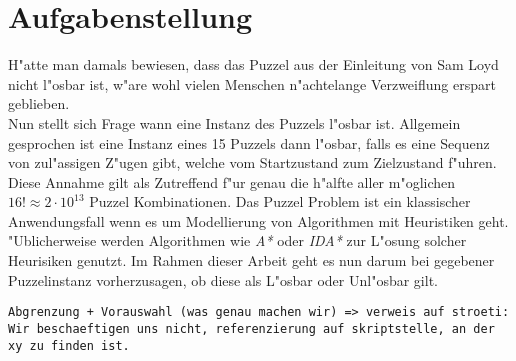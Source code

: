 \section{Aufgabenstellung} %
\label{cha:Aufgabenstellung}
H"atte man damals bewiesen, dass das Puzzel aus der Einleitung von Sam Loyd nicht l"osbar ist, w"are wohl vielen Menschen n"achtelange Verzweiflung erspart geblieben.\\
Nun stellt sich Frage wann eine Instanz des Puzzels l"osbar ist. Allgemein gesprochen ist eine Instanz eines 15 Puzzels dann l"osbar, falls es eine Sequenz von zul"assigen Z"ugen gibt, welche vom Startzustand zum Zielzustand f"uhren.\\
Diese Annahme gilt als Zutreffend f"ur genau die h"alfte aller m"oglichen $16! \approx 2 \cdot 10^{13}$ Puzzel Kombinationen. \autocite{sliding-piece-puzzels:book,solving-15-puzzle-lvi:article}
Das Puzzel Problem ist ein klassischer Anwendungsfall wenn es um Modellierung von Algorithmen mit Heuristiken geht. "Ublicherweise werden Algorithmen wie \textit{A*} oder \textit{IDA*} zur L"osung solcher Heurisiken genutzt.\autocite{wiki-15-puzzle:online,solving-15-puzzle-lvi:article, depth-first-id:article}
Im Rahmen dieser Arbeit geht es nun darum bei gegebener Puzzelinstanz vorherzusagen, ob diese als L"osbar oder Unl"osbar gilt.

\texttt{Abgrenzung + Vorauswahl (was genau machen wir) => verweis auf stroeti: Wir beschaeftigen uns nicht, referenzierung auf skriptstelle, an der xy zu finden ist.}

